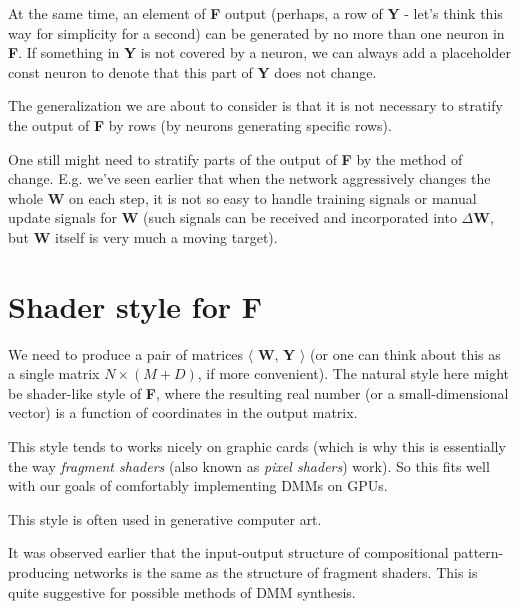 \documentclass{article}
\begin{document}
\smallskip

At the same time, an element of {\bf F} output (perhaps, a row of {\bf Y} - let's think this way for simplicity for a second) can
be generated by no more than one neuron in {\bf F}. If something in {\bf Y} is not covered by a neuron, we can always add a placeholder const neuron to denote that this part of {\bf Y} does not change.

\bigskip

The generalization we are about to consider is that it is not necessary to stratify the output of {\bf F} by rows (by neurons generating specific rows). 

\smallskip

One still might need to stratify parts of the output of {\bf F} by the method of change. E.g. we've seen earlier that when the network aggressively changes the whole {\bf W} on each step, it is not so easy to handle training signals or manual update signals for {\bf W} (such signals can be received and incorporated into $\Delta${\bf W}, but {\bf W} itself is very much a moving target). 

\section{Shader style for {\bf F}}

We need to produce a pair of matrices $\langle\!\!$ {\bf W}, {\bf Y} $\!\!\rangle$ (or one can think about this as a single matrix $N\times (M+D)$, if more convenient). The natural style here might be shader-like style of {\bf F}, where the resulting real number (or a small-dimensional vector) is a function of coordinates in the output matrix.

\smallskip

This style tends to works nicely on graphic cards (which is why this is essentially the way {\em fragment shaders} (also known as {\em pixel shaders}) work). So this fits well with our goals of comfortably implementing DMMs on GPUs.

\smallskip

This style is often used in generative computer art.

\bigskip

It was observed earlier that the input-output structure of compositional pattern-producing networks is the same as the structure of fragment shaders. This is quite suggestive for possible methods of DMM synthesis.
\end{document}
